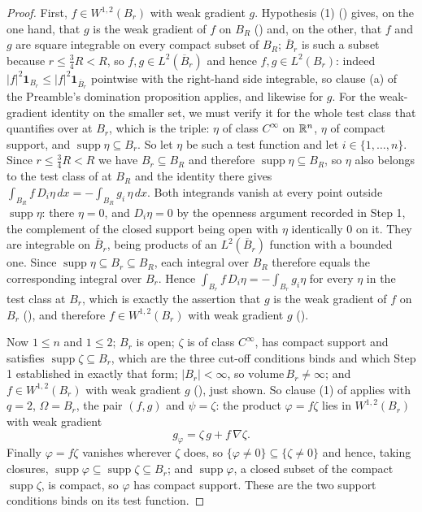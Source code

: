 \begin{proof}
First, $f\in W^{1,2}(B_r)$ with weak gradient $g$.  Hypothesis (1)
() gives, on the one hand, that $g$ is the weak gradient of
$f$ on $B_R$ () and, on the other, that $f$ and $g$
are square integrable on every compact subset of $B_R$; $\overline B_r$ is such a
subset because $r\le\frac34R<R$, so $f,g\in L^2(\overline B_r)$ and hence
$f,g\in L^2(B_r)$: indeed $|f|^2\mathbf 1_{B_r}\le|f|^2\mathbf
1_{\overline B_r}$ pointwise with the right-hand side integrable, so clause (a)
of the Preamble's domination proposition applies, and likewise for $g$.  For
the weak-gradient identity on the smaller set, we must verify it for the whole
test class that  quantifies over at $B_r$, which is
the triple: $\eta$ of class $C^\infty$ on $\mathbb{R}^n$, $\eta$ of compact support, and
$\operatorname{supp}\eta\subseteq B_r$.  So let $\eta$ be such a test function
and let $i\in\{1,\dots,n\}$.  Since $r\le\frac34R<R$ we have
$B_r\subseteq B_R$ and therefore $\operatorname{supp}\eta\subseteq B_R$, so
$\eta$ also belongs to the test class of  at $B_R$
and the identity there gives
$\int_{B_R}f\,D_i\eta\,dx=-\int_{B_R}g_i\,\eta\,dx$.  Both integrands vanish at
every point outside $\operatorname{supp}\eta$: there $\eta=0$, and
$D_i\eta=0$ by the openness argument recorded in Step 1, the complement of the
closed support being open with $\eta$ identically $0$ on it.  They are integrable on $\overline B_r$, being products of an
$L^2(\overline B_r)$ function with a bounded one.  Since
$\operatorname{supp}\eta\subseteq B_r\subseteq B_R$, each integral over $B_R$
therefore equals the corresponding integral over $B_r$.  Hence
$\int_{B_r}f\,D_i\eta=-\int_{B_r}g_i\eta$ for every $\eta$ in the test class at
$B_r$, which is exactly the assertion that $g$ is the weak gradient of $f$ on
$B_r$ (), and therefore
$f\in W^{1,2}(B_r)$ with weak gradient $g$ ().

Now $1\le n$ and $1\le2$; $B_r$ is open; $\zeta$ is of class $C^\infty$, has
compact support and satisfies $\operatorname{supp}\zeta\subseteq B_r$, which are
the three cut-off conditions  binds and which
Step 1 established in exactly that form; $|B_r|<\infty$, so
$\mathrm{volume}\,B_r\ne\infty$; and $f\in W^{1,2}(B_r)$ with weak gradient $g$
(), just shown.  So clause (1) of
 applies with $q=2$, $\Omega=B_r$, the pair
$(f,g)$ and $\psi=\zeta$: the product $\varphi=f\zeta$ lies in
$W^{1,2}(B_r)$ with weak gradient
\[
g_\varphi=\zeta\,g+f\,\nabla\zeta .
\]
Finally $\varphi=f\zeta$ vanishes wherever $\zeta$ does, so
$\{\varphi\ne0\}\subseteq\{\zeta\ne0\}$ and hence, taking closures,
$\operatorname{supp}\varphi\subseteq\operatorname{supp}\zeta\subseteq B_r$; and
$\operatorname{supp}\varphi$, a closed subset of the compact
$\operatorname{supp}\zeta$, is compact, so $\varphi$ has compact support.  These
are the two support conditions  binds on its
test function.


\end{proof}

